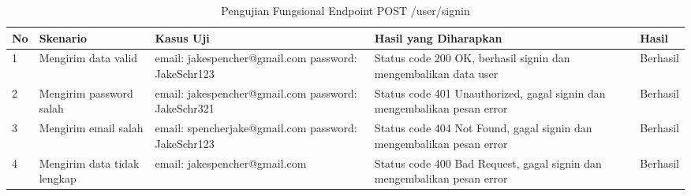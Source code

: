 \begin{table}[H]
    \centering
    \begin{tabular}{|p{0.5cm}|p{3cm}|p{5cm}|p{5cm}|p{1.5cm}|}
        \hline
        \rowcolor[HTML]{DAE8FC} 
        \textbf{No} & \textbf{Skenario} & \textbf{Kasus Uji} & \textbf{Hasil yang Diharapkan} & \textbf{Hasil} \\ \hline
        1 & Mengirim data valid & 
        email: jakespencher@gmail.com \newline 
        password: JakeSchr123 & 
        Status code 200 OK, berhasil signin dan mengembalikan data user & 
        Berhasil \\ \hline
        2 & Mengirim password salah & 
        email: jakespencher@gmail.com \newline 
        password: JakeSchr321 & 
        Status code 401 Unauthorized, gagal signin dan mengembalikan pesan error & 
        Berhasil \\ \hline
        3 & Mengirim email salah & 
        email: spencherjake@gmail.com \newline 
        password: JakeSchr123 & 
        Status code 404 Not Found, gagal signin dan mengembalikan pesan error & 
        Berhasil \\ \hline
        4 & Mengirim data tidak lengkap & 
        email: jakespencher@gmail.com & 
        Status code 400 Bad Request, gagal signin dan mengembalikan pesan error & 
        Berhasil \\ \hline
    \end{tabular}
    \caption{Pengujian Fungsional Endpoint POST /user/signin}
    \label{tab:user_signin_testing}
\end{table}
